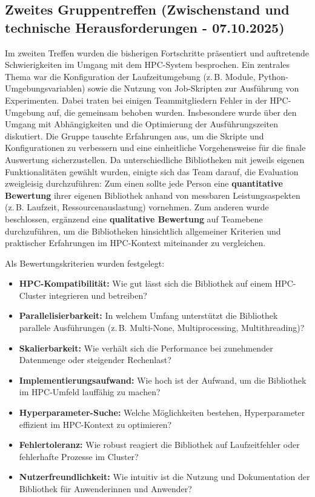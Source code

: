 \documentclass{article}
\begin{document}
\subsection*{Zweites Gruppentreffen (Zwischenstand und technische Herausforderungen - 07.10.2025)}
Im zweiten Treffen wurden die bisherigen Fortschritte präsentiert und auftretende Schwierigkeiten im Umgang mit dem HPC-System besprochen. 
Ein zentrales Thema war die Konfiguration der Laufzeitumgebung (z.\,B. Module, Python-Umgebungsvariablen) sowie die Nutzung von Job-Skripten zur Ausführung von Experimenten. 
Dabei traten bei einigen Teammitgliedern Fehler in der HPC-Umgebung auf, die gemeinsam behoben wurden. 
Insbesondere wurde über den Umgang mit Abhängigkeiten und die Optimierung der Ausführungszeiten diskutiert. 
Die Gruppe tauschte Erfahrungen aus, um die Skripte und Konfigurationen zu verbessern und eine einheitliche Vorgehensweise für die finale Auswertung sicherzustellen. 
Da unterschiedliche Bibliotheken mit jeweils eigenen Funktionalitäten gewählt wurden, einigte sich das Team darauf, die Evaluation zweigleisig durchzuführen: 
Zum einen sollte jede Person eine \textbf{quantitative Bewertung} ihrer eigenen Bibliothek anhand von messbaren Leistungsaspekten (z.\,B. Laufzeit, Ressourcenauslastung) vornehmen. 
Zum anderen wurde beschlossen, ergänzend eine \textbf{qualitative Bewertung} auf Teamebene durchzuführen, um die Bibliotheken hinsichtlich allgemeiner Kriterien 
und praktischer Erfahrungen im HPC-Kontext miteinander zu vergleichen. 

Als Bewertungskriterien wurden festgelegt:
\label{sec:bewertungskriterien}
\begin{itemize}
    \item \textbf{HPC-Kompatibilität:} Wie gut lässt sich die Bibliothek auf einem HPC-Cluster integrieren und betreiben?
    \item \textbf{Parallelisierbarkeit:} In welchem Umfang unterstützt die Bibliothek parallele Ausführungen (z.\,B. Multi-None, Multiprocessing, Multithreading)?
    \item \textbf{Skalierbarkeit:} Wie verhält sich die Performance bei zunehmender Datenmenge oder steigender Rechenlast?
    \item \textbf{Implementierungsaufwand:} Wie hoch ist der Aufwand, um die Bibliothek im HPC-Umfeld lauffähig zu machen?
    \item \textbf{Hyperparameter-Suche:} Welche Möglichkeiten bestehen, Hyperparameter effizient im HPC-Kontext zu optimieren?
    \item \textbf{Fehlertoleranz:} Wie robust reagiert die Bibliothek auf Laufzeitfehler oder fehlerhafte Prozesse im Cluster?
    \item \textbf{Nutzerfreundlichkeit:} Wie intuitiv ist die Nutzung und Dokumentation der Bibliothek für Anwenderinnen und Anwender?
\end{itemize}
\end{document}

